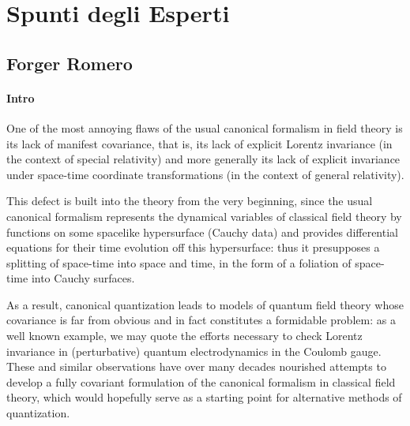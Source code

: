 \documentclass[Main]{subfiles}
\begin{document}
		
	\section{Spunti degli Esperti}
		\subsection{Forger Romero}
			\paragraph{Intro}
			One of the most annoying flaws of the usual canonical formalism in field theory is its lack of manifest covariance, that is, its lack of explicit Lorentz invariance (in the context of special relativity) and more generally its lack of explicit invariance under space-time coordinate transformations (in the context of general relativity). 
			
			This defect is built into the theory from the very beginning, since the usual canonical formalism represents the dynamical variables of classical field theory by functions on some spacelike hypersurface (Cauchy data) and provides differential equations for their time evolution off this hypersurface: thus it presupposes a splitting of space-time into space and time, in the form of a foliation of space-time into Cauchy surfaces.
			
			As a result, canonical quantization leads to models of quantum field theory whose covariance is far from obvious and in fact constitutes a formidable problem: as a well known example, we may quote the efforts necessary to check Lorentz invariance in (perturbative) quantum electrodynamics in the Coulomb gauge. \\
			These and similar observations have over many decades nourished attempts to develop a fully covariant formulation of the canonical formalism in classical field theory, which would hopefully serve as a starting point for alternative methods of quantization.
			
\end{document}
